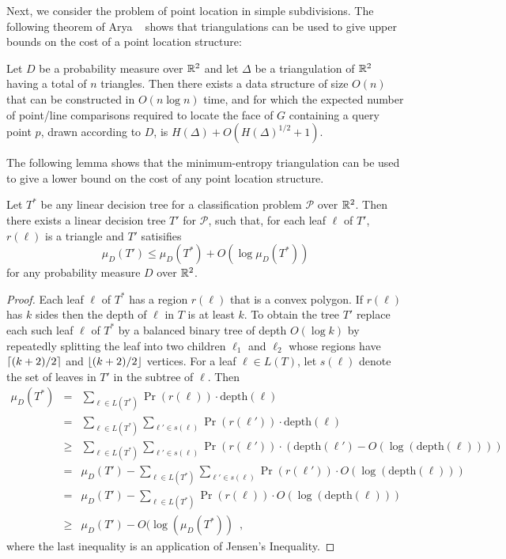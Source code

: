 \documentclass[lotsofwhite]{patmorin}
\newcommand{\depth}{\mathrm{depth}}
\begin{document}
Next, we consider the problem of point location in simple
subdivisions.  The following theorem of Arya \etal\ \cite{ammw07}
shows that triangulations can be used to give upper bounds on the cost
of a point location structure:

\begin{thm}
Let $D$ be a probability measure over $\mathbb{R}^2$ and let $\Delta$ be a
triangulation of $\mathbb{R}^2$ having a total of $n$ triangles.  Then there exists a
data structure of size $O(n)$ that can be constructed in $O(n\log n)$
time, and for which the expected number of point/line comparisons
required to locate the face of $G$ containing a query point $p$, drawn
according to $D$, is $H(\Delta) + O(H(\Delta)^{1/2}+1)$.
\end{thm}

The following lemma shows that the minimum-entropy triangulation can
be used to give a lower bound on the cost of any point location
structure.

\begin{lem}
Let $T^*$ be any linear decision tree for a classification problem
$\mathcal{P}$ over $\mathbb{R}^2$.  Then there exists a linear decision tree
$T'$ for $\mathcal{P}$, such that, for each leaf $\ell$ of $T'$,
$r(\ell)$ is a triangle and $T'$ satisifies
\[
    \mu_D(T') \le \mu_D(T^*) + O(\log\mu_D(T^*))
\]
for any probability measure $D$ over $\mathbb{R}^2$.
\end{lem}

\begin{proof}
Each leaf $\ell$ of $T^*$ has a region $r(\ell)$ that is a convex
polygon.  If $r(\ell)$ has $k$ sides then the depth of $\ell$ in $T$
is at least $k$.  To obtain the tree $T'$ replace each such leaf
$\ell$ of $T^*$ by a balanced binary tree of depth $O(\log k)$ by
repeatedly splitting the leaf into two children $\ell_1$ and $\ell_2$
whose regions have $\left\lceil (k+2)/2 \right\rceil$ and $\left\lfloor (k+2)/2 \right\rfloor$ vertices.
For a leaf $\ell\in L(T)$, let $s(\ell)$ denote the set of leaves in $T'$
in the subtree of $\ell$.   Then
\begin{eqnarray*}
   \mu_D(T^*) 
     &  =  & \sum_{\ell\in L(T^*)} \Pr(r(\ell))\cdot \depth(\ell) \\
     &  =  & \sum_{\ell\in L(T^*)}\sum_{\ell'\in s(\ell)} 
              \Pr(r(\ell'))\cdot \depth(\ell) \\
     & \ge & \sum_{\ell\in L(T^*)} 
             \sum_{\ell'\in s(\ell)}\Pr(r(\ell'))\cdot (\depth(\ell')
                   - O(\log (\depth(\ell)))) \\
     &  =  & \mu_D(T') - \sum_{\ell\in L(T^*)} 
             \sum_{\ell'\in s(\ell)}\Pr(r(\ell'))\cdot O(\log (\depth(\ell))) \\
     &  =  & \mu_D(T') - \sum_{\ell\in L(T^*)} 
             \Pr(r(\ell))\cdot O(\log (\depth(\ell))) \\
     & \ge & \mu_D(T') - O(\log(\mu_D(T^*)) \enspace , 
\end{eqnarray*}
where the last inequality is an application of Jensen's Inequality.
\end{proof}
\end{document}
